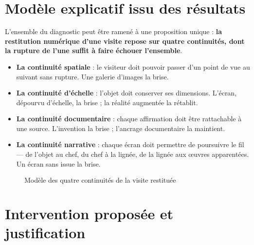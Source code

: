 \section{Modèle explicatif issu des résultats}
\label{sec:modele}

L'ensemble du diagnostic peut être ramené à une proposition unique :
\textbf{la restitution numérique d'une visite repose sur quatre continuités,
dont la rupture de l'une suffit à faire échouer l'ensemble}.

\begin{itemize}
  \item \textbf{La continuité spatiale} : le visiteur doit pouvoir passer d'un
        point de vue au suivant sans rupture. Une galerie d'images la brise.
  \item \textbf{La continuité d'échelle} : l'objet doit conserver ses
        dimensions. L'écran, dépourvu d'échelle, la brise ; la réalité augmentée
        la rétablit.
  \item \textbf{La continuité documentaire} : chaque affirmation doit être
        rattachable à une source. L'invention la brise ; l'ancrage documentaire
        la maintient.
  \item \textbf{La continuité narrative} : chaque écran doit permettre de
        poursuivre le fil — de l'objet au chef, du chef à la lignée, de la
        lignée aux œuvres apparentées. Un écran sans issue la brise.
\end{itemize}

\begin{figure}[htbp]
\centering
{}
\caption{Modèle des quatre continuités de la visite restituée}
\label{fig:modele}
\end{figure}

\section{Intervention proposée et justification}
\label{sec:intervention}

